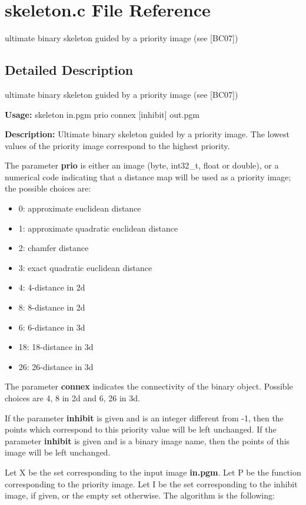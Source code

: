 \section{skeleton.c File Reference}
\label{skeleton_8c}
ultimate binary skeleton guided by a priority image (see [BC07]) 



\subsection{Detailed Description}
ultimate binary skeleton guided by a priority image (see [BC07]) 

{\bf Usage:} skeleton in.pgm prio connex [inhibit] out.pgm

{\bf Description:} Ultimate binary skeleton guided by a priority image. The lowest values of the priority image correspond to the highest priority.

The parameter {\bf prio} is either an image (byte, int32\_\-t, float or double), or a numerical code indicating that a distance map will be used as a priority image; the possible choices are: \begin{itemize}
\item 0: approximate euclidean distance \item 1: approximate quadratic euclidean distance \item 2: chamfer distance \item 3: exact quadratic euclidean distance \item 4: 4-distance in 2d \item 8: 8-distance in 2d \item 6: 6-distance in 3d \item 18: 18-distance in 3d \item 26: 26-distance in 3d\end{itemize}
The parameter {\bf connex} indicates the connectivity of the binary object. Possible choices are 4, 8 in 2d and 6, 26 in 3d.

If the parameter {\bf inhibit} is given and is an integer different from -1, then the points which correspond to this priority value will be left unchanged. If the parameter {\bf inhibit} is given and is a binary image name, then the points of this image will be left unchanged.

Let X be the set corresponding to the input image {\bf in.pgm}. Let P be the function corresponding to the priority image. Let I be the set corresponding to the inhibit image, if given, or the empty set otherwise. The algorithm is the following:



